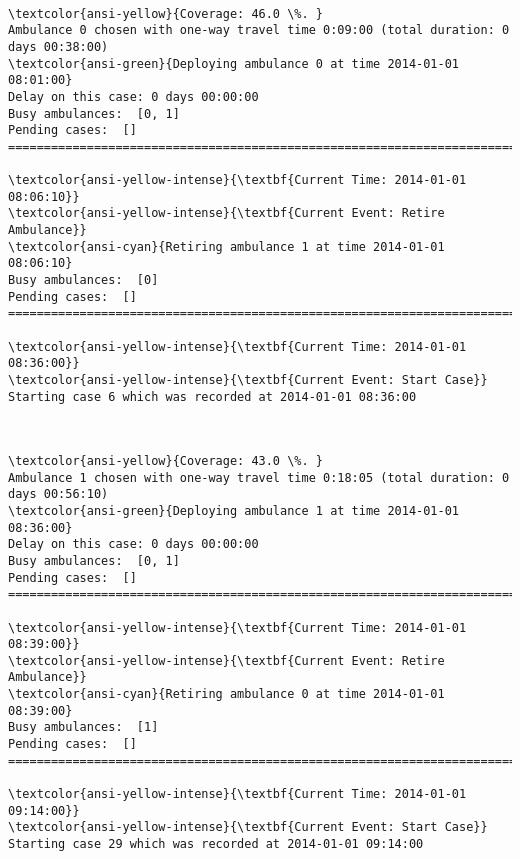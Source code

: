 \documentclass[11pt]{article}
\begin{document}
    \begin{center}
    \end{center}
    { \hspace*{\fill} \\}
    
    \begin{Verbatim}[commandchars=\\\{\}]
\textcolor{ansi-yellow}{Coverage: 46.0 \%. }
Ambulance 0 chosen with one-way travel time 0:09:00 (total duration: 0 days 00:38:00)
\textcolor{ansi-green}{Deploying ambulance 0 at time 2014-01-01 08:01:00}
Delay on this case: 0 days 00:00:00
Busy ambulances:  [0, 1]
Pending cases:  []
========================================================================

\textcolor{ansi-yellow-intense}{\textbf{Current Time: 2014-01-01 08:06:10}}
\textcolor{ansi-yellow-intense}{\textbf{Current Event: Retire Ambulance}}
\textcolor{ansi-cyan}{Retiring ambulance 1 at time 2014-01-01 08:06:10}
Busy ambulances:  [0]
Pending cases:  []
========================================================================

\textcolor{ansi-yellow-intense}{\textbf{Current Time: 2014-01-01 08:36:00}}
\textcolor{ansi-yellow-intense}{\textbf{Current Event: Start Case}}
Starting case 6 which was recorded at 2014-01-01 08:36:00

    \end{Verbatim}

    \begin{center}
    \end{center}
    { \hspace*{\fill} \\}
    
    \begin{Verbatim}[commandchars=\\\{\}]
\textcolor{ansi-yellow}{Coverage: 43.0 \%. }
Ambulance 1 chosen with one-way travel time 0:18:05 (total duration: 0 days 00:56:10)
\textcolor{ansi-green}{Deploying ambulance 1 at time 2014-01-01 08:36:00}
Delay on this case: 0 days 00:00:00
Busy ambulances:  [0, 1]
Pending cases:  []
========================================================================

\textcolor{ansi-yellow-intense}{\textbf{Current Time: 2014-01-01 08:39:00}}
\textcolor{ansi-yellow-intense}{\textbf{Current Event: Retire Ambulance}}
\textcolor{ansi-cyan}{Retiring ambulance 0 at time 2014-01-01 08:39:00}
Busy ambulances:  [1]
Pending cases:  []
========================================================================

\textcolor{ansi-yellow-intense}{\textbf{Current Time: 2014-01-01 09:14:00}}
\textcolor{ansi-yellow-intense}{\textbf{Current Event: Start Case}}
Starting case 29 which was recorded at 2014-01-01 09:14:00

    \end{Verbatim}
\end{document}
